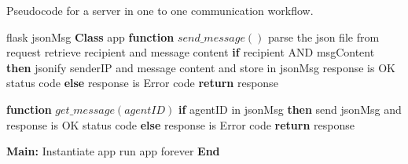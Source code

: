 \begin{algorithm}
    \caption{Pseudocode for a server in one to one communication workflow.}
    \label{alg: apiServerPseudoCode}
    \begin{algorithmic}[1]
     flask
     jsonMsg 
    \State \textbf{Class} app
        \State \qquad \textbf{function} {$send\_message()$}
        \State \qquad {} 
        \State \qquad \qquad parse the json file from request
        \State \qquad \qquad retrieve recipient and message content 
        \State \qquad \qquad \textbf{if} recipient AND msgContent \textbf{then}
        \State \qquad \qquad \qquad jsonify senderIP and message content and store in jsonMsg
        \State \qquad \qquad \qquad response is OK status code
        \State \qquad \qquad \textbf{else}            
        \State \qquad \qquad \qquad response is Error code            
        \State \qquad \qquad \textbf{return} response  

        \State \qquad \textbf{function} {$get\_message(agentID)$}  
        \State \qquad {} 
        \State \qquad \qquad \textbf{if} agentID in jsonMsg \textbf{then}
        \State \qquad \qquad \qquad send jsonMsg and response is OK status code
        \State \qquad \qquad \textbf{else}
        \State \qquad \qquad \qquad response is Error code
        \State \qquad \qquad \textbf{return} response         

    \State \textbf{Main:}
    \State \qquad Instantiate app
    \State \qquad run app forever
    \State \textbf{End} 
    \end{algorithmic}
    \end{algorithm}

